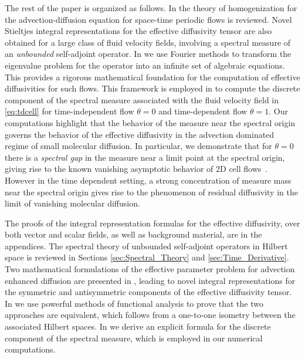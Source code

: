 \documentclass[amsa]{ipart}
\begin{document}
The rest of the paper is organized as follows. In
 the theory of homogenization for the
advection-diffusion equation for space-time periodic flows is
reviewed. Novel Stieltjes integral representations for the effective
diffusivity tensor are also obtained for a large class of fluid
velocity fields, involving a spectral measure of an \emph{unbounded}
self-adjoint operator. In  we use Fourier
methods to transform the eigenvalue problem for the operator into an
infinite set of algebraic equations. This provides a rigorous
mathematical foundation for the computation of effective diffusivities
for such flows. This framework is employed in 
to compute the discrete component of the spectral measure associated
with the fluid velocity field in \eqref{eq:tdcell} for time-independent
flow $\theta=0$ and time-dependent flow $\theta=1$. Our computations highlight
that the behavior of the measure near the spectral origin governs the
behavior of the effective diffusivity in the advection dominated
regime of small molecular diffusion. In particular, we demonstrate
that for $\theta=0$ there is a \emph{spectral gap} in the measure near a
limit point at the spectral origin, giving rise to the known vanishing
asymptotic behavior of 2D cell
flows~\cite{Fannjiang:1994:SIAM_JAM:333}. However in the time
dependent setting, a strong concentration of measure mass near the
spectral origin gives rise to the phenomenon of residual diffusivity
in the limit of vanishing molecular diffusion.


The proofs of the integral  representation formulas for the  effective
diffusivity, over both vector and scalar fields, as well as background
material, are in the appendices. The spectral theory of unbounded self-adjoint
operators in Hilbert space is reviewed in Sections
\ref{sec:Spectral_Theory} and \ref{sec:Time_Derivative}. Two
mathematical formulations of the effective parameter problem for
advection enhanced diffusion are presented in
, leading to novel
integral representations for the symmetric and antisymmetric
components of the effective diffusivity tensor. In
 we use powerful methods of
functional analysis to prove that the two approaches are equivalent,
which follows from a one-to-one isometry between the associated
Hilbert spaces. In  we derive an explicit
formula for the discrete component of the spectral measure, which is
employed in our numerical computations.
\end{document}
